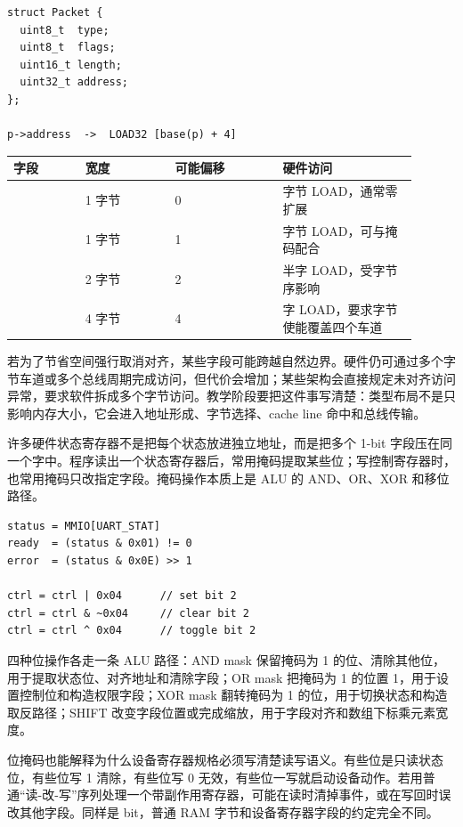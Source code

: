 \begin{lstlisting}
struct Packet {
  uint8_t  type;
  uint8_t  flags;
  uint16_t length;
  uint32_t address;
};

p->address  ->  LOAD32 [base(p) + 4]
\end{lstlisting}

\begin{longtable}{L{0.16\linewidth}L{0.2\linewidth}L{0.24\linewidth}L{0.3\linewidth}}
\toprule
字段 & 宽度 & 可能偏移 & 硬件访问 \\
\midrule
{} & 1 字节 & 0 & 字节 LOAD，通常零扩展 \\
 & 1 字节 & 1 & 字节 LOAD，可与掩码配合 \\
 & 2 字节 & 2 & 半字 LOAD，受字节序影响 \\
 & 4 字节 & 4 & 字 LOAD，要求字节使能覆盖四个车道 \\
\bottomrule
\end{longtable}

若为了节省空间强行取消对齐，某些字段可能跨越自然边界。硬件仍可通过多个字节车道或多个总线周期完成访问，但代价会增加；某些架构会直接规定未对齐访问异常，要求软件拆成多个字节访问。教学阶段要把这件事写清楚：类型布局不是只影响内存大小，它会进入地址形成、字节选择、cache line 命中和总线传输。

许多硬件状态寄存器不是把每个状态放进独立地址，而是把多个 1-bit 字段压在同一个字中。程序读出一个状态寄存器后，常用掩码提取某些位；写控制寄存器时，也常用掩码只改指定字段。掩码操作本质上是 ALU 的 AND、OR、XOR 和移位路径。

\begin{lstlisting}
status = MMIO[UART_STAT]
ready  = (status & 0x01) != 0
error  = (status & 0x0E) >> 1

ctrl = ctrl | 0x04      // set bit 2
ctrl = ctrl & ~0x04     // clear bit 2
ctrl = ctrl ^ 0x04      // toggle bit 2
\end{lstlisting}

四种位操作各走一条 ALU 路径：AND mask 保留掩码为 1 的位、清除其他位，用于提取状态位、对齐地址和清除字段；OR mask 把掩码为 1 的位置 1，用于设置控制位和构造权限字段；XOR mask 翻转掩码为 1 的位，用于切换状态和构造取反路径；SHIFT 改变字段位置或完成缩放，用于字段对齐和数组下标乘元素宽度。

位掩码也能解释为什么设备寄存器规格必须写清楚读写语义。有些位是只读状态位，有些位写 1 清除，有些位写 0 无效，有些位一写就启动设备动作。若用普通“读-改-写”序列处理一个带副作用寄存器，可能在读时清掉事件，或在写回时误改其他字段。同样是 bit，普通 RAM 字节和设备寄存器字段的约定完全不同。

